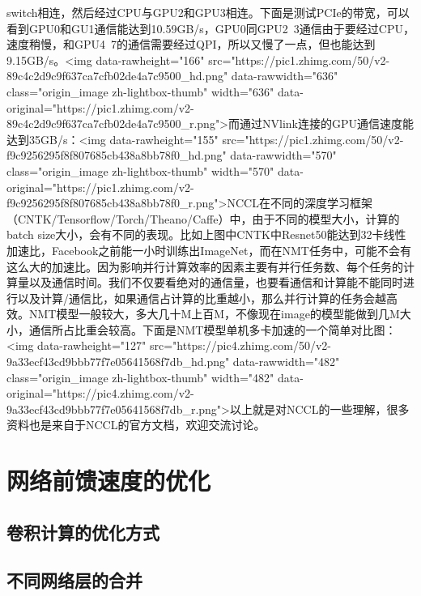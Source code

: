 switch相连，然后经过CPU与GPU2和GPU3相连。下面是测试PCIe的带宽，可以看到GPU0和GU1通信能达到10.59GB/s，GPU0同GPU2~3通信由于要经过CPU，速度稍慢，和GPU4~7的通信需要经过QPI，所以又慢了一点，但也能达到9.15GB/s。<img data-rawheight="166" src="https://pic1.zhimg.com/50/v2-89c4c2d9c9f637ca7cfb02de4a7c9500_hd.png" data-rawwidth="636" class="origin_image zh-lightbox-thumb" width="636" data-original="https://pic1.zhimg.com/v2-89c4c2d9c9f637ca7cfb02de4a7c9500_r.png">而通过NVlink连接的GPU通信速度能达到35GB/s：<img data-rawheight="155" src="https://pic1.zhimg.com/50/v2-f9c9256295f8f807685cb438a8bb78f0_hd.png" data-rawwidth="570" class="origin_image zh-lightbox-thumb" width="570" data-original="https://pic1.zhimg.com/v2-f9c9256295f8f807685cb438a8bb78f0_r.png">NCCL在不同的深度学习框架（CNTK/Tensorflow/Torch/Theano/Caffe）中，由于不同的模型大小，计算的batch size大小，会有不同的表现。比如上图中CNTK中Resnet50能达到32卡线性加速比，Facebook之前能一小时训练出ImageNet，而在NMT任务中，可能不会有这么大的加速比。因为影响并行计算效率的因素主要有并行任务数、每个任务的计算量以及通信时间。我们不仅要看绝对的通信量，也要看通信和计算能不能同时进行以及计算/通信比，如果通信占计算的比重越小，那么并行计算的任务会越高效。NMT模型一般较大，多大几十M上百M，不像现在image的模型能做到几M大小，通信所占比重会较高。下面是NMT模型单机多卡加速的一个简单对比图：<img data-rawheight="127" src="https://pic4.zhimg.com/50/v2-9a33ecf43cd9bbb77f7e05641568f7db_hd.png" data-rawwidth="482" class="origin_image zh-lightbox-thumb" width="482" data-original="https://pic4.zhimg.com/v2-9a33ecf43cd9bbb77f7e05641568f7db_r.png">以上就是对NCCL的一些理解，很多资料也是来自于NCCL的官方文档，欢迎交流讨论。



\section{网络前馈速度的优化}
\subsection{卷积计算的优化方式}
\subsection{不同网络层的合并}







